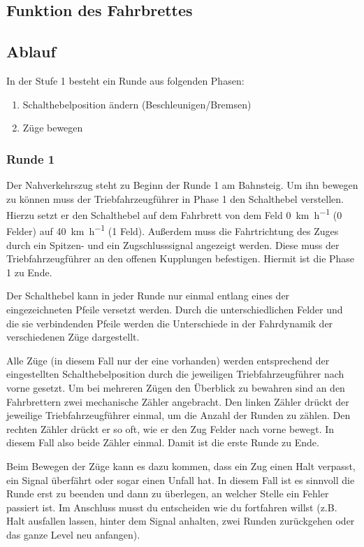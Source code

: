\subsection*{Funktion des Fahrbrettes}

\setup


\subsection*{Ablauf}
  In der Stufe 1 besteht ein Runde aus folgenden Phasen:
  \begin{enumerate}
    \item Schalthebelposition ändern (Beschleunigen/Bremsen)
    \item Züge bewegen
  \end{enumerate}

\subsubsection*{Runde 1}
   Der Nahverkehrszug steht zu Beginn der Runde 1 am Bahnsteig. Um ihn bewegen zu können muss der Triebfahrzeugführer in Phase 1 den Schalthebel verstellen. Hierzu setzt er den Schalthebel auf dem Fahrbrett von dem Feld \SI{0}{\kilo\metre\per\hour} (0 Felder) auf \SI{40}{\kilo\metre\per\hour} (1 Feld). Außerdem muss die Fahrtrichtung des Zuges durch ein Spitzen- und ein Zugschlusssignal angezeigt werden. Diese muss der Triebfahrzeugführer an den offenen Kupplungen befestigen. Hiermit ist die Phase 1 zu Ende.
  \begin{framed}\noindent
    Der Schalthebel kann in jeder Runde nur einmal entlang eines der eingezeichneten Pfeile versetzt werden. Durch die unterschiedlichen Felder und die sie verbindenden Pfeile werden die Unterschiede in der Fahrdynamik der verschiedenen Züge dargestellt.
  \end{framed}

   Alle Züge (in diesem Fall nur der eine vorhanden) werden entsprechend der eingestellten Schalthebelposition durch die jeweiligen Triebfahrzeugführer nach vorne gesetzt. Um bei mehreren Zügen den Überblick zu bewahren sind an den Fahrbrettern zwei mechanische Zähler angebracht. Den linken Zähler drückt der jeweilige Triebfahrzeugführer einmal, um die Anzahl der Runden zu zählen. Den rechten Zähler drückt er so oft, wie er den Zug Felder nach vorne bewegt. In diesem Fall also beide Zähler einmal. Damit ist die erste Runde zu Ende.
  \begin{framed}\noindent
    Beim Bewegen der Züge kann es dazu kommen, dass ein Zug einen Halt verpasst, ein Signal überfährt oder sogar einen Unfall hat. In diesem Fall ist es sinnvoll die Runde erst zu beenden und dann zu überlegen, an welcher Stelle ein Fehler passiert ist. Im Anschluss musst du entscheiden wie du fortfahren willst (z.B. Halt ausfallen lassen, hinter dem Signal anhalten, zwei Runden zurückgehen oder das ganze Level neu anfangen).
  \end{framed}

